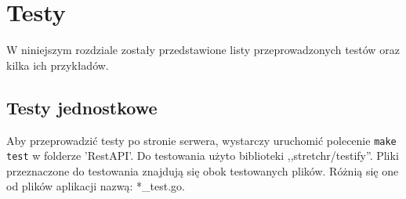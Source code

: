 \chapter{Testy}
\label{ch:Testy}
W niniejszym rozdziale zostały przedstawione listy przeprowadzonych testów oraz kilka ich przykładów.
\section{Testy jednostkowe}
Aby przeprowadzić testy po stronie serwera, wystarczy uruchomić polecenie \texttt{make test} w folderze 'RestAPI'.
Do testowania użyto biblioteki ,,stretchr/testify''.
Pliki przeznaczone do testowania znajdują się obok testowanych plików. Różnią się one od plików aplikacji nazwą: *\_test.go.

